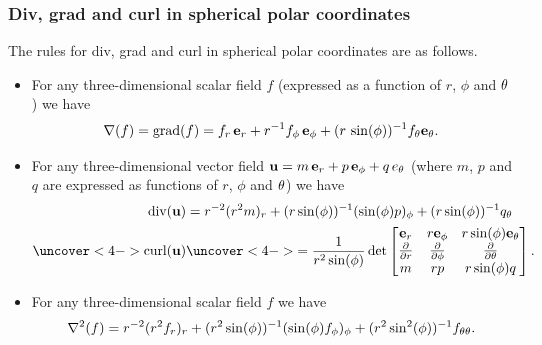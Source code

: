 \documentclass[9pt]{beamer}
\begin{document}
\begin{frame}[t]
 \frametitle{Div, grad and curl in spherical polar coordinates}

 The rules for div, grad and curl in spherical polar
 coordinates are as follows.

 \begin{itemize}
  \item<2->[(a)] For any three-dimensional scalar field $f$ (expressed as a
   function of $r$, $\phi$ and $\theta$) we have 
   \[ \nabla(f) = \operatorname{grad}(f) =
        f_r\,\mathbf{e}_r + r^{-1}f_\phi\,\mathbf{e}_\phi +
         (r\,\sin(\phi))^{-1}f_\theta\mathbf{e}_\theta.
   \]
  \item<3->[(b)] For any three-dimensional vector field
   $\mathbf{u}=m\,\mathbf{e}_r+p\,\mathbf{e}_\phi+q\,e_\theta$ (where $m$, $p$ and $q$ are expressed as
   functions of $r$, $\phi$ and $\theta$) we have 
   \begin{align*}
    \dv(\vu)
     &= r^{-2}(r^2m)_r + (r\sin(\phi))^{-1}(\sin(\phi)p)_\phi + 
         (r\sin(\phi))^{-1}q_\tht \\
    \uc<4->{\curl(\vu)}
     &\uc<4->{=
        \frac{1}{r^2\sin(\phi)} \det\bbm
          \ve_r & r\ve_\phi & r\sin(\phi)\ve_\tht \\
          \ddr  & \ddp      & \ddt  \\
          m     & rp        & r\sin(\phi)q \ebm.}
   \end{align*}
  \item<5->[(c)] For any three-dimensional scalar field $f$ we have 
   \[ \nabla^2(f) = 
      r^{-2}(r^2f_r)_r +
      (r^2\sin(\phi))^{-1}(\sin(\phi)f_\phi)_\phi + 
      (r^2\sin^2(\phi))^{-1} f_{\theta\theta}.
   \]
 \end{itemize}
\end{frame}
\end{document}
